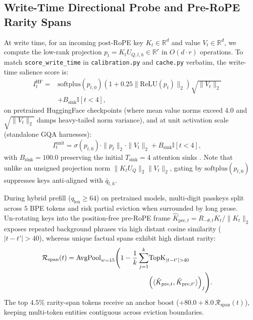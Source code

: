 \documentclass[conference]{IEEEtran}
\begin{document}
\subsection{Write-Time Directional Probe and Pre-RoPE Rarity Spans}
At write time, for an incoming post-RoPE key $K_t \in \mathbb{R}^d$ and value $V_t \in \mathbb{R}^d$, we compute the low-rank projection $p_t = K_t U_{Q,l,h} \in \mathbb{R}^r$ in $O(d \cdot r)$ operations. To match \texttt{score\_write\_time} in \texttt{calibration.py} and \texttt{cache.py} verbatim, the write-time salience score is:
\begin{equation}
\begin{aligned}
I_t^{\text{HF}} = {} & \text{softplus}(p_{t,0})\!\left(1 + 0.25\|\text{ReLU}(p_t)\|_2\right)\sqrt{\|V_t\|_2} \\
                     & + B_{\text{sink}}\mathbb{I}[t < 4],
\end{aligned}
\label{eq:write_probe_hf}
\end{equation}
on pretrained HuggingFace checkpoints (where mean value norms exceed $4.0$ and $\sqrt{\|V_t\|_2}$ damps heavy-tailed norm variance), and at unit activation scale (standalone GQA harnesses):
\begin{equation}
I_t^{\text{unit}} = \sigma(p_{t,0}) \cdot \|p_t\|_2 \cdot \|V_t\|_2 + B_{\text{sink}}\mathbb{I}[t < 4],
\label{eq:write_probe_unit}
\end{equation}
with $B_{\text{sink}} = 100.0$ preserving the initial $T_{\text{sink}} = 4$ attention sinks \cite{b3}. Note that unlike an unsigned projection norm $\|K_t U_Q\|_2 \|V_t\|_2$, gating by $\text{softplus}(p_{t,0})$ suppresses keys anti-aligned with $\bar{q}_{l,h}$.

During hybrid prefill ($q_{\text{len}} \ge 64$) on pretrained models, multi-digit passkeys split across $5$ BPE tokens and risk partial eviction when surrounded by long prose. Un-rotating keys into the position-free pre-RoPE frame $\hat{K}_{\text{pre}, t} = R_{-\theta, t} K_t / \|K_t\|_2$ exposes repeated background phrases via high distant cosine similarity ($|t - t'| > 40$), whereas unique factual spans exhibit high distant rarity:
\begin{equation}
\begin{aligned}
\mathcal{R}_{\text{span}}(t) = \text{AvgPool}_{w=15}\Biggl(1 - \frac{1}{k}\sum_{j=1}^{k} & \text{TopK}_{|t-t'|>40} \\
& \Bigl(\langle \hat{K}_{\text{pre},t}, \hat{K}_{\text{pre},t'}\rangle\Bigr)_j\Biggr).
\end{aligned}
\label{eq:rarity_span}
\end{equation}
The top $4.5\%$ rarity-span tokens receive an anchor boost ($+80.0 + 8.0\,\mathcal{R}_{\text{span}}(t)$), keeping multi-token entities contiguous across eviction boundaries.
\end{document}
